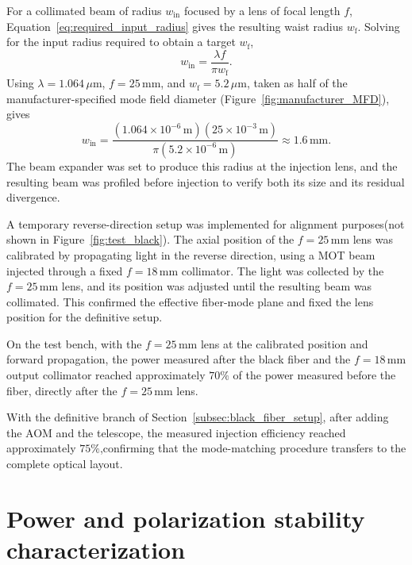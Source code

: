 For a collimated beam of radius $w_{\mathrm{in}}$ focused by a lens of focal length $f$, Equation~\eqref{eq:required_input_radius} gives the resulting waist radius $w_{\mathrm{f}}$. Solving for the input radius required to obtain a target $w_{\mathrm{f}}$,
\begin{equation}
    w_{\mathrm{in}} = \frac{\lambda f}{\pi w_{\mathrm{f}}}.
    \label{eq:required_input_radius}
\end{equation}
Using $\lambda=1.064\,\mu\mathrm{m}$, $f=25\,\mathrm{mm}$, and $w_{\mathrm{f}}=5.2\,\mu\mathrm{m}$, taken as half of the manufacturer-specified mode field diameter (Figure~\ref{fig:manufacturer_MFD}), gives
\begin{equation}
    w_{\mathrm{in}}
    =
    \frac{
        (1.064\times10^{-6}\,\mathrm{m})
        (25\times10^{-3}\,\mathrm{m})
    }{
        \pi
        (5.2\times10^{-6}\,\mathrm{m})
    }
    \approx
    1.6\,\mathrm{mm}.
\end{equation}
The beam expander was set to produce this radius at the injection lens, and the resulting beam was profiled before injection to verify both its size and its residual divergence.

A temporary reverse-direction setup was implemented for alignment purposes(not shown in Figure~\ref{fig:test_black}). The axial position of the $f=25\,\mathrm{mm}$ lens was calibrated by propagating light in the reverse direction, using a MOT beam injected through a fixed $f=18\,\mathrm{mm}$ collimator. The light was collected by the $f=25\,\mathrm{mm}$ lens, and its position was adjusted until the resulting beam was collimated. This confirmed the effective fiber-mode plane and fixed the lens position for the definitive setup.


On the test bench, with the $f=25\,\mathrm{mm}$ lens at the calibrated position and forward propagation, the power measured after the black fiber and the $f=18\,\mathrm{mm}$ output collimator reached approximately $70\%$ of the power measured before the fiber, directly after the $f=25\,\mathrm{mm}$ lens. 

With the definitive branch of Section~\ref{subsec:black_fiber_setup}, after adding the AOM and the telescope, the measured injection efficiency reached approximately $75\%$,confirming that the mode-matching procedure transfers to the complete optical layout.

\section{Power and polarization stability characterization}
\label{sec:black_fiber_polarization}

